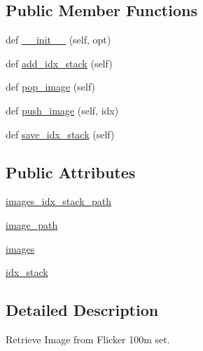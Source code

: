 \subsection*{Public Member Functions}
\begin{DoxyCompactItemize}
\item 
def \hyperlink{classpersonality__captions_1_1worlds_1_1ImageGenerator_adeb74aa2ebf4ace2c39ab7f811629b98}{\+\_\+\+\_\+init\+\_\+\+\_\+} (self, opt)
\item 
def \hyperlink{classpersonality__captions_1_1worlds_1_1ImageGenerator_a4861d21c69ec7e05b958d948b55dbbec}{add\+\_\+idx\+\_\+stack} (self)
\item 
def \hyperlink{classpersonality__captions_1_1worlds_1_1ImageGenerator_a3ed9513ae59885f39f95a65d610b9b54}{pop\+\_\+image} (self)
\item 
def \hyperlink{classpersonality__captions_1_1worlds_1_1ImageGenerator_a78705bbcfdb530dc94ff25cc0aa7fd65}{push\+\_\+image} (self, idx)
\item 
def \hyperlink{classpersonality__captions_1_1worlds_1_1ImageGenerator_a1a62516fa0aad79a400d8824f7353d42}{save\+\_\+idx\+\_\+stack} (self)
\end{DoxyCompactItemize}
\subsection*{Public Attributes}
\begin{DoxyCompactItemize}
\item 
\hyperlink{classpersonality__captions_1_1worlds_1_1ImageGenerator_a3cb7292fe4be4bd3e9c1e16e763da509}{images\+\_\+idx\+\_\+stack\+\_\+path}
\item 
\hyperlink{classpersonality__captions_1_1worlds_1_1ImageGenerator_a2f6d917895f5fa19821b69f793dc1dd7}{image\+\_\+path}
\item 
\hyperlink{classpersonality__captions_1_1worlds_1_1ImageGenerator_a28a704ac1a923cc558c63ac4bcf2bb65}{images}
\item 
\hyperlink{classpersonality__captions_1_1worlds_1_1ImageGenerator_a4a79f6542b070b63fb41d09306a95ef9}{idx\+\_\+stack}
\end{DoxyCompactItemize}


\subsection{Detailed Description}
\begin{DoxyVerb}Retrieve Image from Flicker 100m set.
\end{DoxyVerb}
 

